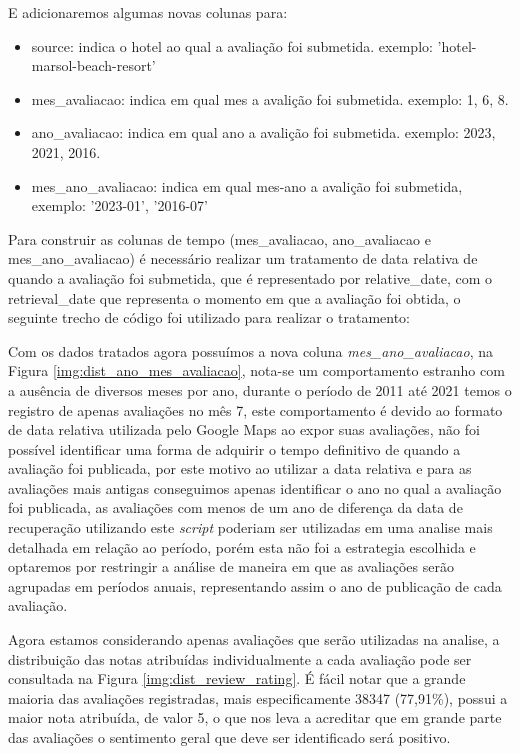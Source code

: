 E adicionaremos algumas novas colunas para:

\begin{itemize}
	\item source: indica o hotel ao qual a avaliação foi submetida. exemplo: 'hotel-marsol-beach-resort'
	\item mes\_avaliacao: indica em qual mes a avalição foi submetida. exemplo: 1, 6, 8.
	\item ano\_avaliacao: indica em qual ano a avalição foi submetida. exemplo: 2023, 2021, 2016.
	\item mes\_ano\_avaliacao: indica em qual mes-ano a avalição foi submetida, exemplo: '2023-01', '2016-07'
\end{itemize}


Para construir as colunas de tempo (mes\_avaliacao, ano\_avaliacao e mes\_ano\_avaliacao) é necessário realizar um tratamento de data relativa de quando a avaliação foi submetida, que é representado por relative\_date, com o retrieval\_date que representa o momento em que a avaliação foi obtida, o seguinte trecho de código foi utilizado para realizar o tratamento:


Com os dados tratados agora possuímos a nova coluna \emph{mes\_ano\_avaliacao}, na Figura \ref{img:dist_ano_mes_avaliacao}, nota-se um comportamento estranho com a ausência de diversos meses por ano, durante o período de 2011 até 2021 temos o registro de apenas avaliações no mês 7, este comportamento é devido ao formato de data relativa utilizada pelo Google Maps ao expor suas avaliações, não foi possível identificar uma forma de adquirir o tempo definitivo de quando a avaliação foi publicada, por este motivo ao utilizar a data relativa e para as avaliações mais antigas conseguimos apenas identificar o ano no qual a avaliação foi publicada, as avaliações com menos de um ano de diferença da data de recuperação utilizando este \textit{script} poderiam ser utilizadas em uma analise mais detalhada em relação ao período, porém esta não foi a estrategia escolhida e optaremos por restringir a análise de maneira em que as avaliações serão agrupadas em períodos anuais, representando assim o ano de publicação de cada avaliação.

Agora estamos considerando apenas avaliações que serão utilizadas na analise, a distribuição das notas atribuídas individualmente a cada avaliação pode ser consultada na Figura \ref{img:dist_review_rating}. É fácil notar que a grande maioria das avaliações registradas, mais especificamente 38347 (77,91\%), possui a maior nota atribuída, de valor 5, o que nos leva a acreditar que em grande parte das avaliações o sentimento geral que deve ser identificado será positivo.


